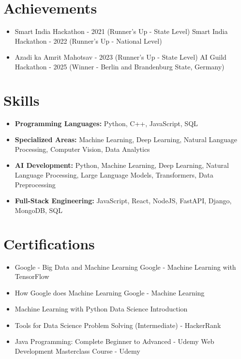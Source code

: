 \documentclass[a4paper,10pt]{article}
\begin{document}
\section*{Achievements}
\begin{itemize}
\item Smart India Hackathon - 2021 (Runner's Up - State Level) \hfill Smart India Hackathon - 2022 (Runner's Up - National Level)
\item Azadi ka Amrit Mahotsav - 2023 (Runner's Up - State Level) \hfill AI Guild Hackathon - 2025 (Winner - Berlin and Brandenburg State, Germany)
\end{itemize}

\section*{Skills}
\begin{itemize}
  \item \textbf{Programming Languages:} Python, C++, JavaScript, SQL
  \item \textbf{Specialized Areas:} Machine Learning, Deep Learning, Natural Language Processing, Computer Vision, Data Analytics
  \item \textbf{AI Development:} Python, Machine Learning, Deep Learning, Natural Language Processing, Large Language Models, Transformers, Data Preprocessing
  \item \textbf{Full-Stack Engineering:} JavaScript, React, NodeJS, FastAPI, Django, MongoDB, SQL
\end{itemize}

\section*{Certifications}
\begin{itemize}
\item Google - Big Data and Machine Learning \hfill Google - Machine Learning with TensorFlow
\item How Google does Machine Learning \hfill Google - Machine Learning
\item Machine Learning with Python \hfill Data Science Introduction
\item Tools for Data Science \hfill Problem Solving (Intermediate) - HackerRank
\item Java Programming: Complete Beginner to Advanced - Udemy \hfill Web Development Masterclass Course - Udemy
\end{itemize}
\end{document}
